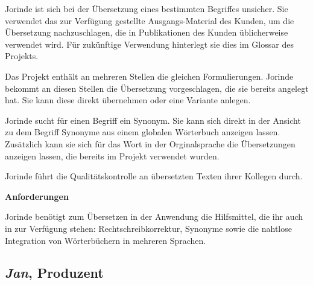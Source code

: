 \begin{multicols}{2}
Jorinde ist sich bei der Übersetzung eines bestimmten Begriffes unsicher. Sie verwendet das zur Verfügung gestellte Ausgangs-Material des Kunden, um die Übersetzung nachzuschlagen, die in Publikationen des Kunden üblicherweise verwendet wird. Für zukünftige Verwendung hinterlegt sie dies im Glossar des Projekts.

Das Projekt enthält an mehreren Stellen die gleichen Formulierungen. Jorinde bekommt an diesen Stellen die Übersetzung vorgeschlagen, die sie bereits angelegt hat. Sie kann diese direkt übernehmen oder eine Variante anlegen.

Jorinde sucht für einen Begriff ein Synonym. Sie kann sich direkt in der Ansicht zu dem Begriff Synonyme aus einem globalen Wörterbuch anzeigen lassen. Zusätzlich kann sie sich für das Wort in der Orginalsprache die Übersetzungen anzeigen lassen, die bereits im Projekt verwendet wurden.

Jorinde führt die Qualitätskontrolle an übersetzten Texten ihrer Kollegen durch.

\textbf{Anforderungen}

Jorinde benötigt zum Übersetzen in der Anwendung die Hilfsmittel, die ihr auch in  zur Verfügung stehen: Rechtschreibkorrektur, Synonyme sowie die nahtlose Integration von Wörterbüchern in mehreren Sprachen.

\end{multicols}

\pagebreak

\subsection{\emph{Jan}, Produzent}\label{p:jan}

